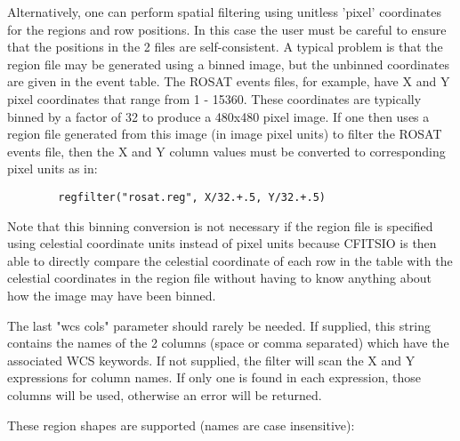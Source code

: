 \documentclass[11pt]{book}
\begin{document}
    Alternatively, one can perform spatial filtering using unitless
    'pixel' coordinates for the regions and row positions.  In this
    case the user must be careful to ensure that the positions in the 2
    files are self-consistent.  A typical problem is that the region
    file may be generated using a binned image, but the unbinned
    coordinates are given in the event table.  The ROSAT events files,
    for example, have X and Y pixel coordinates that range from 1 -
    15360.  These coordinates are typically binned by a factor of 32 to
    produce a 480x480 pixel image.  If one then uses a region file
    generated from this image (in image pixel units) to filter the
    ROSAT events file, then the X and Y column values must be converted
    to corresponding pixel units as in:

\begin{verbatim}
        regfilter("rosat.reg", X/32.+.5, Y/32.+.5)
\end{verbatim}
    Note that this binning conversion is not necessary if the region
    file is specified using celestial coordinate units instead of pixel
    units because CFITSIO is then able to directly compare the
    celestial coordinate of each row in the table with the celestial
    coordinates in the region file without having to know anything
    about how the image may have been binned.

    The last "wcs cols" parameter should rarely be needed. If supplied,
    this  string contains the names of the 2 columns (space or comma
    separated) which have the associated WCS keywords. If not supplied,
    the filter  will scan the X  and Y expressions for column names.
    If only one is found in each  expression, those columns will be
    used, otherwise an error will be returned.

    These region shapes are supported (names are case insensitive):
\end{document}
